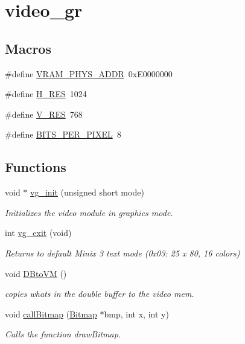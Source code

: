 \hypertarget{group__video__gr}{}\section{video\+\_\+gr}
\label{group__video__gr}
\subsection*{Macros}
\begin{DoxyCompactItemize}
\item 
\#define \hyperlink{group__video__gr_gac854e8352d97c69bdfe247573593ba3b}{V\+R\+A\+M\+\_\+\+P\+H\+Y\+S\+\_\+\+A\+D\+DR}~0x\+E0000000
\item 
\#define \hyperlink{group__video__gr_gabf6f66114c31b8f87c80534ca695a00b}{H\+\_\+\+R\+ES}~1024
\item 
\#define \hyperlink{group__video__gr_gaac2466862bcfc18231c38fe1eacc22e3}{V\+\_\+\+R\+ES}~768
\item 
\#define \hyperlink{group__video__gr_ga35faf89171af20cd21088c37d62bb7ee}{B\+I\+T\+S\+\_\+\+P\+E\+R\+\_\+\+P\+I\+X\+EL}~8
\end{DoxyCompactItemize}
\subsection*{Functions}
\begin{DoxyCompactItemize}
\item 
void $\ast$ \hyperlink{group__video__gr_gacef21667c79365d57a084bed994c2189}{vg\+\_\+init} (unsigned short mode)
\begin{DoxyCompactList}\small\item\em Initializes the video module in graphics mode. \end{DoxyCompactList}\item 
int \hyperlink{group__video__gr_ga42f593e6656f1a978315aff02b1bcebf}{vg\+\_\+exit} (void)
\begin{DoxyCompactList}\small\item\em Returns to default Minix 3 text mode (0x03\+: 25 x 80, 16 colors) \end{DoxyCompactList}\item 
void \hyperlink{group__video__gr_ga4f5703f9b121dc5e85673680a1082c7d}{D\+Bto\+VM} ()
\begin{DoxyCompactList}\small\item\em copies what\textquotesingle{}s in the double buffer to the video mem. \end{DoxyCompactList}\item 
void \hyperlink{group__video__gr_gaec2a87af63bfdab6d54b82012bdaa80e}{call\+Bitmap} (\hyperlink{struct_bitmap}{Bitmap} $\ast$bmp, int x, int y)
\begin{DoxyCompactList}\small\item\em Calls the function draw\+Bitmap. \end{DoxyCompactList}\end{DoxyCompactItemize}


